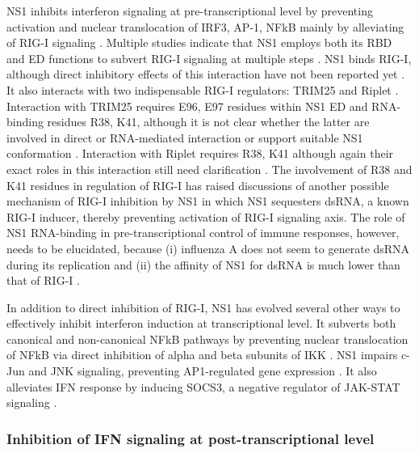 		
		\gls{NS1} inhibits interferon signaling at pre-transcriptional level by preventing activation and nuclear translocation of IRF3, AP-1, NFkB mainly by alleviating of \gls{RIG-I} signaling \parencite{Talon2000, Ludwig2002, Wang2000, Geiss2002, Munir2012}. Multiple studies indicate that NS1 employs both its \gls{RBD} and \gls{ED} functions to subvert \gls{RIG-I} signaling at multiple steps \parencite{Haye2009, Ludwig2002, Tisoncik2011, Wang2000}. NS1 binds \gls{RIG-I}, although direct inhibitory effects of this interaction have not been reported yet \parencite{Opitz2007, Mibayashi2007a}. It also interacts with two indispensable \gls{RIG-I} regulators: TRIM25 and Riplet \parencite{Gack2009, Rajsbaum2012}. Interaction with TRIM25 requires E96, E97 residues within NS1 ED and RNA-binding residues R38, K41, although it is not clear whether the latter are involved in direct or RNA-mediated interaction or support suitable NS1 conformation \parencite{Gack2009}. Interaction with Riplet requires R38, K41 although again their exact roles in this interaction still need clarification \parencite{Rajsbaum2012}. The involvement of R38 and K41 residues in regulation of RIG-I has raised discussions of another possible mechanism of RIG-I inhibition by NS1 in which NS1 sequesters dsRNA, a known RIG-I inducer, thereby preventing activation of RIG-I signaling axis. The role of NS1 RNA-binding in pre-transcriptional control   of immune responses, however, needs to be elucidated, because (i) influenza A does not seem to generate dsRNA during its replication \parencite{Wisskirchen2011} and (ii) the affinity of NS1 for dsRNA is much lower than that of RIG-I \parencite{Chien2004, Yin2007, Vela2012}.
		
		In addition to direct inhibition of RIG-I, NS1 has evolved several other ways to  effectively inhibit interferon induction at transcriptional level. It subverts both canonical and non-canonical \gls{NFkB} pathways \parencite{Ruckle2012a} by preventing nuclear translocation of \gls{NFkB} via direct inhibition of alpha and beta subunits of \gls{IKK} \parencite{Gao2012}. \gls{NS1} impairs c-Jun and JNK signaling, preventing \gls{AP1}-regulated gene expression \parencite{Ludwig2002}. It also alleviates IFN response by inducing \gls{SOCS3}, a negative regulator of \gls{JAK}-STAT signaling \parencite{Pauli2008}. 
		
		\subsubsection{Inhibition of IFN signaling at post-transcriptional level}
		
